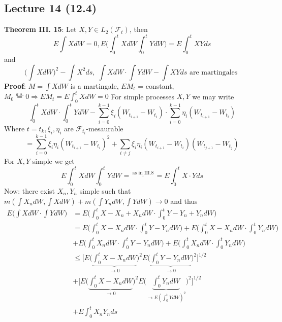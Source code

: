 \documentclass[english]{article}
\newcommand{\ub}{\underbrace}
\newcommand{\note}[1]{\noindent\textbf{#1}}
\newcommand{\F}{\mathcal F}
\newcommand{\as}[1]{\stackrel {a.s.}{#1}}
\begin{document}
\subsection*{Lecture 14 (12.4)}
\note{Theorem III. 15}: Let $X,Y \in L_2(\F_t)$, then
$$E\int X dW = 0, E\Big( \int^t_0 X dW \int^t_0 Y dW \Big) = E\int^t_0 XY ds$$
and
$$\Big(\int X dW \Big)^2- \int X^2 ds, \; \int X dW \cdot \int Y dW - \int X Y ds \text{ are martingales }$$
\note{Proof}: $M = \int X dW$ is a martingale, $EM_t$ = constant, $M_0 \as = 0 \Rightarrow EM_t = E\int^t_0 X dW = 0$ \newline
For simple processes $X,Y$ we may write
$$\int^t_0 X dW \cdot \int^t_0 Y dW - \sum^{k-1}_{i=0} \xi_i (W_{t_{i+1}} - W_{t_i} ) \cdot \sum^{k-1}_{i=0} \eta_i ( W_{t_{i+1}} - W_{t_i})$$
Where $t=t_k, \xi_i, \eta_i$ are $\F_{t_i}$-mesaurable
$$= \sum^{k-1}_{i=0} \xi_i \eta_i (W_{t_{i+1}} - W_{t_i} )^2 + \sum_{i\neq j} \xi_i \eta_i (W_{t_{i+1}} - W_{t_i} )(W_{t_{j+1}} - W_{t_j} )$$
For $X,Y$ simple we get
$$E \int^t_0 X dW \int^t_0 Y dW = \stackrel{\text{as in III.8}}\cdot = E\int^t_0 X\cdot Y ds$$
Now: there exist $X_n, Y_n$ simple such that $m(\int X_n dW, \int X dW) + m(\int Y_n dW, \int Y dW) \to 0$ and thus
\begin{align*} E \Big( \int X dW \cdot \int Y dW \Big) &= E \Big( \int^t_0 X - X_n + X_n dW \cdot \int^t_0 Y - Y_n + Y_n dW\Big)\\
& = E \Big(\int^t_0 X - X_n dW \cdot \int^t_0 Y- Y_n dW\Big) + E \Big(\int^t_0 X - X_n dW \cdot \int^t_0 Y_n dW\Big)\\
& + E \Big(\int^t_0 X_n dW \cdot \int^t_0 Y- Y_n dW\Big) + E \Big(\int^t_0 X_n dW \cdot \int^t_0 Y_n dW\Big)\\
& \leq \Big[  E \Big(\ub{\int^t_0 X - X_n d W}_{\to 0}\Big)^2 E\Big( \ub{\int^t_0 Y- Y_n dW}_{\to 0}\Big)^2\Big]^{1/2}\\
& + \Big[  E \Big(\ub{\int^t_0 X - X_n d W}_{\to 0}\Big)^2 E\Big( \ub{\int^t_0 Y_n dW}_{\to E(\int^t_0 Y dW)^2}\Big)^2\Big]^{1/2} \\
& + E\int^t_0 X_n Y_n ds \\
\end{align*}
\end{document}

